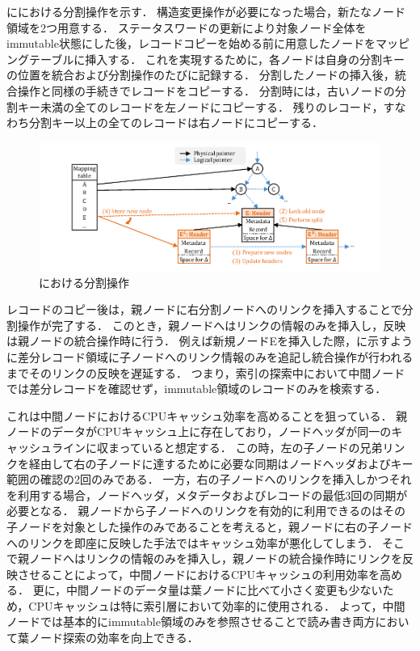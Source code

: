 \Fig{\ref{fig:bc_tree_split}}に\Bctree{}における分割操作を示す．
構造変更操作が必要になった場合，新たなノード領域を2つ用意する．
ステータスワードの更新により対象ノード全体をimmutable状態にした後，レコードコピーを始める前に用意したノードをマッピングテーブルに挿入する．
これを実現するために，各ノードは自身の分割キーの位置を統合および分割操作のたびに記録する．
分割したノードの挿入後，統合操作と同様の手続きでレコードをコピーする．
分割時には，古いノードの分割キー未満の全てのレコードを左ノードにコピーする．
残りのレコード，すなわち分割キー以上の全てのレコードは右ノードにコピーする．

\begin{figure}[t]
    \centering
    \includegraphics{./figures/Bc-split.pdf}
    \caption{\Bctree{}における分割操作}
    \label{fig:bc_tree_split}
\end{figure}

レコードのコピー後は，親ノードに右分割ノードへのリンクを挿入することで分割操作が完了する．
このとき，親ノードへはリンクの情報のみを挿入し，反映は親ノードの統合操作時に行う．
例えば新規ノードEを挿入した際，\Fig{\ref{fig:bc_tree_inner_nodes}}に示すように差分レコード領域に子ノードへのリンク情報のみを追記し統合操作が行われるまでそのリンクの反映を遅延する．
つまり，索引の探索中において中間ノードでは差分レコードを確認せず，immutable領域のレコードのみを検索する．

これは中間ノードにおけるCPUキャッシュ効率を高めることを狙っている．
親ノードのデータがCPUキャッシュ上に存在しており，ノードヘッダが同一のキャッシュラインに収まっていると想定する．
この時，左の子ノードの兄弟リンクを経由して右の子ノードに達するために必要な同期はノードヘッダおよびキー範囲の確認の2回のみである．
一方，右の子ノードへのリンクを挿入しかつそれを利用する場合，ノードヘッダ，メタデータおよびレコードの最低3回の同期が必要となる．
親ノードから子ノードへのリンクを有効的に利用できるのはその子ノードを対象とした操作のみであることを考えると，親ノードに右の子ノードへのリンクを即座に反映した手法ではキャッシュ効率が悪化してしまう．
そこで親ノードへはリンクの情報のみを挿入し，親ノードの統合操作時にリンクを反映させることによって，中間ノードにおけるCPUキャッシュの利用効率を高める．
更に，中間ノードのデータ量は葉ノードに比べて小さく変更も少ないため，CPUキャッシュは特に索引層において効率的に使用される．
よって，中間ノードでは基本的にimmutable領域のみを参照させることで読み書き両方において葉ノード探索の効率を向上できる．

